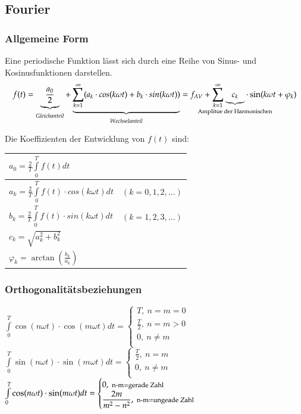 \subsection{Fourier}%
\subsubsection{Allgemeine Form}
Eine periodische Funktion lässt sich durch eine Reihe von Sinus- und Kosinusfunktionen darstellen.
$$f(t) = \underbrace{\frac{a_{0}}{2}}_{Gleichanteil}+\underbrace{\sum_{k = 1}^{\infty} (a_{k} \cdot cos(k \omega t)+ b_{k} \cdot sin(k \omega t))}_{Wechselanteil} = f_{AV}+ \sum_{k = 1}^{\infty} \underbrace{c_k}_{\makebox[0pt]{\text{\scriptsize Amplitue der Harmonischen}}} \cdot \sin(k\omega t + \varphi_k)$$

\begin{minipage}{0.5\linewidth}
    Die Koeffizienten der Entwicklung von $f(t)$ sind: \vfill
    \begin{tabular}{|ll|}
        \hline
        $a_{0} = \frac{2}{T}\int\limits_{0}^{T}f(t)dt$ & \\
        \hline
        $a_{k} = \frac{2}{T}\int\limits_{0}^{T}f(t) \cdot cos(k \omega t)dt$   &
         $(k = 0,1,2,...)$\\
        \hline
        $b_{k} = \frac{2}{T}\int\limits_{0}^{T}f(t) \cdot sin(k \omega t)dt$   &
         $(k = 1,2,3,...)$\\
        \hline
        $c_{k} = \sqrt{a_k^2 + b_k^2}$ &\\
        \hline
        $\varphi_k = \arctan(\frac{b_k}{a_k}) $&\\
        \hline
    \end{tabular}
\end{minipage}
\begin{minipage}{0.5\linewidth}
    \subsubsection{Orthogonalitätsbeziehungen}
    $\int\limits_0^T \cos(n\omega t)\cdot \cos(m\omega t)dt=
    \begin{cases}
    T,\ n=m=0\\
    \frac{T}{2},\ n=m>0\\ 
    0,\ n\neq m\\
    \end{cases}$\\
    
    
    $\int\limits_0^T \sin(n\omega t)\cdot \sin(m\omega t)dt=
    \begin{cases}
    \frac{T}{2},\ n=m\\
    0,\ n\neq m\\
    \end{cases}$\\
    $\int\limits_0^T \cos(n\omega t)\cdot \sin(m\omega t)dt=
    \begin{cases}
    0,\ \text{\footnotesize n-m=gerade Zahl}\\
    \dfrac{2m}{m^2-n^2},\ \text{{\footnotesize n-m=ungeade Zahl}}\\
    \end{cases}$
\end{minipage}

